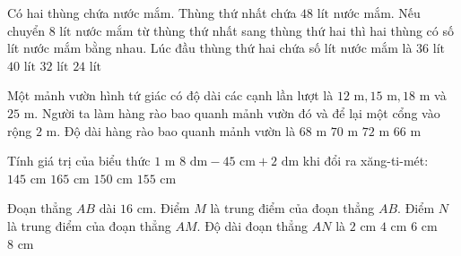 \begin{ex} %
Có hai thùng chứa nước mắm. Thùng thứ nhất chứa $48\text{ lít}$ nước mắm. Nếu chuyển $8\text{ lít}$ nước mắm từ thùng thứ nhất sang thùng thứ hai thì hai thùng có số lít nước mắm bằng nhau. Lúc đầu thùng thứ hai chứa số lít nước mắm là
\choice
{$36\text{ lít}$}
{$40\text{ lít}$}
{\True $32\text{ lít}$}
{$24\text{ lít}$}
\end{ex}

\begin{ex} %
Một mảnh vườn hình tứ giác có độ dài các cạnh lần lượt là $12\text{ m}, 15\text{ m}, 18\text{ m}$ và $25\text{ m}$. Người ta làm hàng rào bao quanh mảnh vườn đó và để lại một cổng vào rộng $2\text{ m}$. Độ dài hàng rào bao quanh mảnh vườn là
\choice
{\True $68\text{ m}$}
{$70\text{ m}$}
{$72\text{ m}$}
{$66\text{ m}$}
\end{ex}

\begin{ex} %
Tính giá trị của biểu thức $1\text{ m } 8\text{ dm} - 45\text{ cm} + 2\text{ dm}$ khi đổi ra xăng-ti-mét:
\choice
{$145\text{ cm}$}
{$165\text{ cm}$}
{$150\text{ cm}$}
{\True $155\text{ cm}$}
\end{ex}

\begin{ex} %
Đoạn thẳng $AB$ dài $16\text{ cm}$. Điểm $M$ là trung điểm của đoạn thẳng $AB$. Điểm $N$ là trung điểm của đoạn thẳng $AM$. Độ dài đoạn thẳng $AN$ là
\choice
{$2\text{ cm}$}
{\True $4\text{ cm}$}
{$6\text{ cm}$}
{$8\text{ cm}$}
\end{ex}

